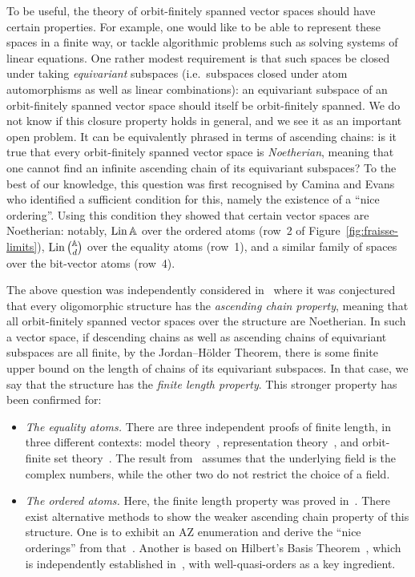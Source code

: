 To be useful, the theory of orbit-finitely spanned vector spaces should have certain properties. 
For example, one would like to be able to represent these spaces in a finite way, or tackle algorithmic problems such as solving systems of linear equations. 
One rather modest requirement is that such spaces be closed under taking \emph{equivariant} subspaces 
(i.e.~subspaces closed under atom automorphisms as well as linear combinations): 
an equivariant subspace of an orbit-finitely spanned vector space should itself be orbit-finitely spanned. 
We do not know if this closure property holds in general, and we see it as an important open problem. 
It can be equivalently phrased in terms of ascending chains: 
is it true that every orbit-finitely spanned vector space is \emph{Noetherian}, meaning that one cannot find an infinite ascending chain of its equivariant subspaces? 
To the best of our knowledge, this question was first recognised by Camina and Evans~\cite[Q.~2]{CaminaEvans_91} who identified a sufficient condition for this, namely the existence of a ``nice ordering''. 
Using this condition they showed that certain vector spaces are Noetherian: notably, $\operatorname{Lin} \mathbb{A}$ over the ordered atoms (row~2 of Figure~\ref{fig:fraisse-limits}), $\operatorname{Lin} {\binom {\mathbb{A}} d}$ over the equality atoms (row~1), and a similar family of spaces over the bit-vector atoms (row~4). 

The above question was independently considered in~\cite[p.~21]{BFKM24} where it was conjectured that every oligomorphic structure has the \emph{ascending chain property}, meaning that all orbit-finitely spanned vector spaces over the structure are Noetherian.
In such a vector space, if descending chains as well as ascending chains of equivariant subspaces are all finite, by the Jordan--Hölder Theorem, there is some finite upper bound on the length of chains of its equivariant subspaces.
In that case, we say that the structure has the \emph{finite length property}.
This stronger property has been confirmed for:
\begin{itemize}
    \item \emph{The equality atoms.} 
    There are three independent proofs of finite length, in three different contexts: model theory~\cite[Thm.~3.9]{EvansRashwan_02}, representation theory~\cite[Prop.~6.1.6]{SamSnowden_15}, and orbit-finite set theory~\cite[Cor.~4.9]{BFKM24}. 
    The result from~\cite{SamSnowden_15} assumes that the underlying field is the complex numbers, while the other two do not restrict the choice of a field. 
    \item \emph{The ordered atoms.} 
    Here, the finite length property was proved in~\cite[Thm.~4.8]{BFKM24}. 
    There exist alternative methods to show the weaker ascending chain property of this structure.
    One is to exhibit an AZ enumeration \cite[Thm.~2.1]{RationalsHaveAZ} and derive the ``nice orderings'' from that~\cite{Evans_pm2}.
    Another is based on Hilbert's Basis Theorem~\cite[Thm.~27]{GhoshLasota_24}, which is independently established in~\cite[Ex.~3.2(c)]{LaudoneSnowden_23}, with well-quasi-orders as a key ingredient.
\end{itemize}

